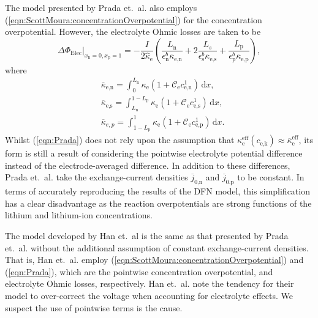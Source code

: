\documentclass[a4paper]{article}
\newcommand{\ts}[1]{_{\text{#1}}}
\newcommand{\mybar}{\overline}
\begin{document}
The model presented by Prada et.~al. \cite{prada2012simplified} also 
employs (\ref{eqn:ScottMoura:concentrationOverpotential}) for the concentration
overpotential. However, the electrolyte Ohmic losses are taken to be 
\begin{equation}\label{eqn:Prada}
  \Delta \Phi_{\text{Elec}}\big|_{x\ts{n}=0,x\ts{p}=1} = -\frac{I}{2\hat{\kappa}\ts{e}} \left(\frac{L\ts{n}}{\epsilon\ts{n}^b\mybar{\kappa}\ts{e,n}} + 2\frac{L_s}{\epsilon\ts{s}^b \mybar{\kappa}\ts{e,s}} + \frac{L\ts{p}}{\epsilon\ts{p}^b\mybar{\kappa}\ts{e,p}} \right), 
\end{equation}
where
\begin{equation}\label{eqn:sigma_bar_notation}
  \begin{aligned}
    &\mybar{\kappa}\ts{e,n} = \int_{0}^{L\ts{n}} \kappa\ts{e}\left(1+\mathcal{C}\ts{e} c\ts{e,n}^1\right)\,\text{d}x, \\
    &\mybar{\kappa}\ts{e,s} = \int_{L\ts{n}}^{1-L\ts{p}} \kappa\ts{e}\left(1+\mathcal{C}\ts{e} c\ts{e,s}^1\right)\,\text{d}x, \\
    &\mybar{\kappa}_{e,p} = \int_{1-L\ts{p}}^1 \kappa\ts{e}\left(1+\mathcal{C}\ts{e} c\ts{e,p}^1\right)\,\text{d}x.
  \end{aligned}
\end{equation}
Whilst (\ref{eqn:Prada}) does not rely upon the assumption that 
$\kappa\ts{e}^{\text{eff}}(c\ts{e,k})\approx\mybar{\kappa}\ts{e}^{\text{eff}}$, 
its form is still a result of considering the pointwise electrolyte potential difference instead of the 
electrode-averaged difference. In addition to these differences, Prada et.~al. \cite{prada2012simplified} take the exchange-current densities $\mybar{j}\ts{0,n}$ and $\mybar{j}\ts{0,p}$ to be constant. In terms of accurately reproducing the results of the DFN model, this simplification has a clear disadvantage as the reaction overpotentials are strong functions of the lithium and lithium-ion concentrations. 

The model developed by Han et.~al \cite{han2015simplification} is the same as that presented by Prada et.~al. \cite{prada2012simplified} without the additional assumption of constant exchange-current densities. That is, Han et.~al. \cite{han2015simplification} employ (\ref{eqn:ScottMoura:concentrationOverpotential}) and (\ref{eqn:Prada}), which are the pointwise concentration overpotential, and electrolyte Ohmic losses, respectively. Han et.~al. \cite{han2015simplification} note the tendency for their model to over-correct the voltage when accounting for electrolyte effects. We suspect the use of pointwise terms is the cause.
\end{document}

